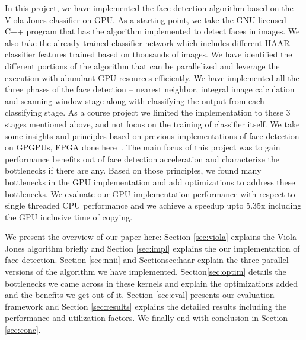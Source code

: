 In this project, we have implemented the  face detection algorithm 
based on the Viola Jones classifier on GPU. 
As a starting point, we take the GNU licensed C++ program that has the 
algorithm implemented to detect faces in images. We also take the already trained 
classifier network which includes different HAAR classifier features trained based on thousands of images. 
We have identified the different  portions of the algorithm that 
can be parallelized and leverage the execution with abundant GPU resources efficiently. 
We have implemented all the three phases of the face detection -- nearest neighbor, integral image calculation and
scanning window stage along with classifying the output from each classifying stage. 
As a course project we limited the implementation to these 3 stages mentioned above, 
and not focus on the training of classifier itself. We take some insights and principles
based on previous implementations of face detection on GPGPUs, FPGA done here~\cite{kong2010gpu, sun2013acceleration, cho2009fpga}.
The main focus of this project was to gain performance benefits out of face detection acceleration and characterize
the bottlenecks if there are any. Based on those principles, we found many bottlenecks in the GPU implementation and add
optimizations to address these bottlenecks. We evaluate our GPU implementation performance with respect to single threaded CPU performance 
and we achieve a speedup upto 5.35x including the GPU inclusive time of copying.

We present the overview of our paper here:
Section \ref{sec:viola} explains the Viola Jones algorithm briefly and Section \ref{sec:impl} explains the our implementation of face detection.
Section \ref{sec:nnii} and Section{sec:haar} explain the three parallel versions of the algorithm we have implemented. Section\ref{sec:optim} details
the bottlenecks we came across in these kernels and explain the optimizations added and the benefits we get out of it. Section \ref{sec:eval} presents our evaluation framework
and Section \ref{sec:results} explains the detailed results including the performance and utilization factors. 
We finally end with conclusion in 
Section \ref{sec:conc}.


